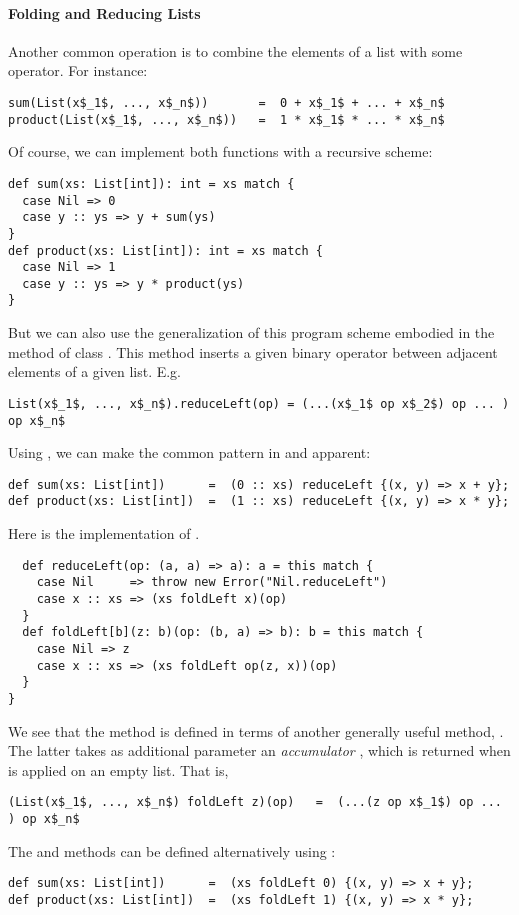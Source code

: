 \paragraph{Folding and Reducing Lists}
Another common operation is to combine the elements of a list with
some operator.  For instance:
\begin{lstlisting}
sum(List(x$_1$, ..., x$_n$))       =  0 + x$_1$ + ... + x$_n$
product(List(x$_1$, ..., x$_n$))   =  1 * x$_1$ * ... * x$_n$
\end{lstlisting}
Of course, we can implement both functions with a
recursive scheme:
\begin{lstlisting}
def sum(xs: List[int]): int = xs match {
  case Nil => 0
  case y :: ys => y + sum(ys)
}
def product(xs: List[int]): int = xs match {
  case Nil => 1
  case y :: ys => y * product(ys)
}
\end{lstlisting}
But we can also use the generalization of this program scheme embodied
in the  method of class .  This method
inserts a given binary operator between adjacent elements of a given list.
E.g.\ 
\begin{lstlisting}
List(x$_1$, ..., x$_n$).reduceLeft(op) = (...(x$_1$ op x$_2$) op ... ) op x$_n$
\end{lstlisting}
Using , we can make the common pattern
in  and  apparent:
\begin{lstlisting}
def sum(xs: List[int])      =  (0 :: xs) reduceLeft {(x, y) => x + y};
def product(xs: List[int])  =  (1 :: xs) reduceLeft {(x, y) => x * y};
\end{lstlisting}
Here is the implementation of .
\begin{lstlisting}
  def reduceLeft(op: (a, a) => a): a = this match {
    case Nil     => throw new Error("Nil.reduceLeft")
    case x :: xs => (xs foldLeft x)(op)
  }
  def foldLeft[b](z: b)(op: (b, a) => b): b = this match {
    case Nil => z
    case x :: xs => (xs foldLeft op(z, x))(op)
  }
}
\end{lstlisting}
We see that the  method is defined in terms of
another generally useful method, .  The latter takes as
additional parameter an {\em accumulator} \code{z}, which is returned
when \code{foldLeft} is applied on an empty list. That is,
\begin{lstlisting}
(List(x$_1$, ..., x$_n$) foldLeft z)(op)   =  (...(z op x$_1$) op ... ) op x$_n$
\end{lstlisting}
The  and  methods can be defined alternatively
using \code{foldLeft}:
\begin{lstlisting}
def sum(xs: List[int])      =  (xs foldLeft 0) {(x, y) => x + y};
def product(xs: List[int])  =  (xs foldLeft 1) {(x, y) => x * y};
\end{lstlisting}

